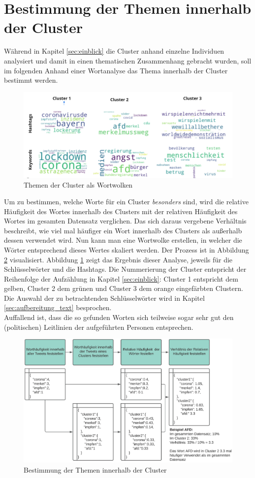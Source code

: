\section{Bestimmung der Themen innerhalb der Cluster}
\label{sec:topics}
Während in Kapitel \ref{sec:einblick} die Cluster anhand einzelne Individuen analysiert und damit in einen thematischen Zusammenhang gebracht wurden, soll im folgenden Anhand einer Wortanalyse das Thema innerhalb der Cluster bestimmt werden.
\begin{figure}[h]
	\centering
	\includegraphics[width=\linewidth]{images/cluster_topics}
	\caption{Themen der Cluster als Wortwolken}
	\label{fig:topics}
\end{figure}
\newline
Um zu bestimmen, welche Worte für ein Cluster \textit{besonders} sind, wird die relative Häufigkeit des Wortes innerhalb des Clusters mit der relativen Häufigkeit des Wortes im gesamten Datensatz verglichen. Das sich daraus vergebene Verhältnis beschreibt, wie viel mal häufiger ein Wort innerhalb des Clusters als außerhalb dessen verwendet wird. Nun kann man eine Wortwolke erstellen, in welcher die Wörter entsprechend dieses Wertes skaliert werden. Der Prozess ist in Abbildung \ref{fig:prozess_topics} visualisiert. Abbildung \ref{fig:topics} zeigt das Ergebnis dieser Analyse, jeweils für die Schlüsselwörter und die Hashtags. Die Nummerierung der Cluster entspricht der Reihenfolge der Aufzählung in Kapitel \ref{sec:einblick}: Cluster 1 entspricht dem gelben, Cluster 2 dem grünen und Cluster 3 dem orange eingefärbten Clustern. Die Auswahl der zu betrachtenden Schlüsselwörter wird in Kapitel \ref{sec:aufbereitung_text} besprochen. \\ \newline
Auffallend ist, dass die so gefunden Worten sich teilweise sogar sehr gut den (politischen) Leitlinien der aufgeführten Personen entsprechen.
\begin{figure}[h]
	\centering
	\includegraphics[width=\linewidth]{images/getting_cluster_topics}
	\caption{Bestimmung der Themen innerhalb der Cluster}
	\label{fig:prozess_topics}
\end{figure}





